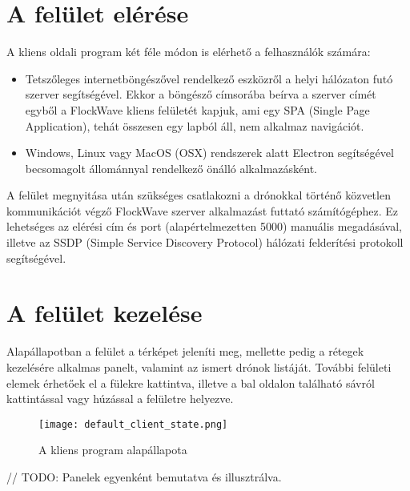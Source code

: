 \section{A felület elérése}

A kliens oldali program két féle módon is elérhető a felhasználók számára:
\begin{itemize}
  \item Tetszőleges internetböngészővel rendelkező eszközről a helyi hálózaton
  futó szerver segítségével. Ekkor a böngésző címsorába beírva a szerver címét
  egyből a FlockWave kliens felületét kapjuk, ami egy SPA (Single Page
  Application), tehát összesen egy lapból áll, nem alkalmaz navigációt.
  \item Windows, Linux vagy MacOS (OSX) rendszerek alatt Electron segítségével
  becsomagolt állománnyal rendelkező önálló alkalmazásként.
\end{itemize}

A felület megnyitása után szükséges csatlakozni a drónokkal történő közvetlen
kommunikációt végző FlockWave szerver alkalmazást futtató számítógéphez. Ez
lehetséges az elérési cím és port (alapértelmezetten 5000) manuális megadásával,
illetve az SSDP (Simple Service Discovery Protocol) hálózati felderítési
protokoll segítségével.

\section{A felület kezelése}

Alapállapotban a felület a térképet jeleníti meg, mellette pedig a rétegek
kezelésére alkalmas panelt, valamint az ismert drónok listáját. További felületi
elemek érhetőek el a fülekre kattintva, illetve a bal oldalon található sávról
kattintással vagy húzással a felületre helyezve.

\begin{figure}[h!]
  \center
  \texttt{[image: default\_client\_state.png]}
  \caption{A kliens program alapállapota}
  \label{fig:default_client_state}
\end{figure}

// TODO: Panelek egyenként bemutatva és illusztrálva.
